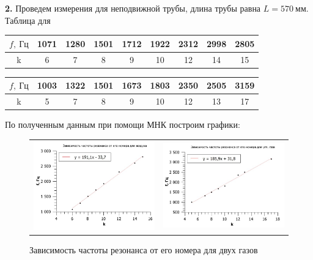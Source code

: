 \documentclass[12pt,a4paper]{article}
\begin{document}
\textbf{2.} Проведем измерения для неподвижной трубы, длина трубы равна $L = 570 \: \textit{мм}$. Таблица для

\vspace{0.5cm}

\begin{tabular}{|c|c|c|c|c|c|c|c|c|}
\hline 
$f, \: \textit{Гц}$ & 1071 & 1280 & 1501 & 1712 & 1922 & 2312 & 2998 & 2805 \\ 
\hline
k  &  6  & 7 & 8 & 9 & 10 & 12 & 14 & 15\\
\hline
\end{tabular} 

\vspace{0.5cm}

\begin{tabular}{|c|c|c|c|c|c|c|c|c|}
\hline 
$f, \: \textit{Гц}$ & 1003 & 1322 & 1501 & 1673 & 1803 & 2350 & 2505 & 3159 \\ 
\hline 
k & 5 & 7 & 8 & 9 & 10 & 12 & 13 & 17 \\ 
\hline 
\end{tabular} 

\vspace{0.5cm}

По полученным данным при помощи МНК построим графики:

\vspace{0.5cm}

\begin{figure}[ht]\center
\begin{tabular}{cc}
\includegraphics[width=60mm]{V_5-1.jpg}
&
\includegraphics[width=60mm]{CO2_5-1.jpg}
\end{tabular}
\caption{Зависимость частоты резонанса от его номера для двух газов}
\end{figure}
\end{document}
